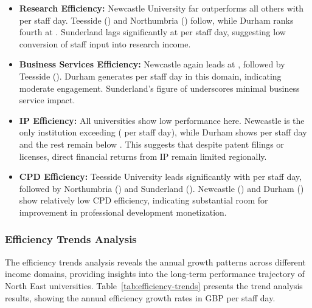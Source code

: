 \documentclass[journal,onecolumn, 10pt,draftclsnofoot]{IEEEtran}
\begin{document}
\begin{itemize}
    \item \textbf{Research Efficiency:} Newcastle University far outperforms all others with  per staff day. Teesside () and Northumbria () follow, while Durham ranks fourth at . Sunderland lags significantly at  per staff day, suggesting low conversion of staff input into research income.
    
    \item \textbf{Business Services Efficiency:} Newcastle again leads at , followed by Teesside (). Durham generates  per staff day in this domain, indicating moderate engagement. Sunderland's figure of  underscores minimal business service impact.
    
    \item \textbf{IP Efficiency:} All universities show low performance here. Newcastle is the only institution exceeding  ( per staff day), while Durham shows  per staff day and the rest remain below . This suggests that despite patent filings or licenses, direct financial returns from IP remain limited regionally.
    
    \item \textbf{CPD Efficiency:} Teesside University leads significantly with  per staff day, followed by Northumbria () and Sunderland (). Newcastle () and Durham () show relatively low CPD efficiency, indicating substantial room for improvement in professional development monetization.
\end{itemize}

\subsubsection{Efficiency Trends Analysis}

The efficiency trends analysis reveals the annual growth patterns across different income domains, providing insights into the long-term performance trajectory of North East universities. Table~\ref{tab:efficiency-trends} presents the trend analysis results, showing the annual efficiency growth rates in GBP per staff day.
\end{document}
